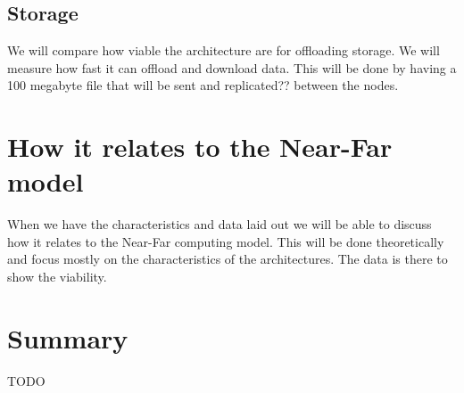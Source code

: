 \subsection{Storage}
We will compare how viable the architecture are for offloading storage. We will measure how fast it can offload and download data. This will be done by having a 100 megabyte file that will be sent and replicated?? between the nodes.






\section{How it relates to the Near-Far model}
When we have the characteristics and data laid out we will be able to discuss how it relates to the Near-Far computing model. This will be done theoretically and focus mostly on the characteristics of the architectures. The data is there to show the viability.








\section{Summary}
TODO



